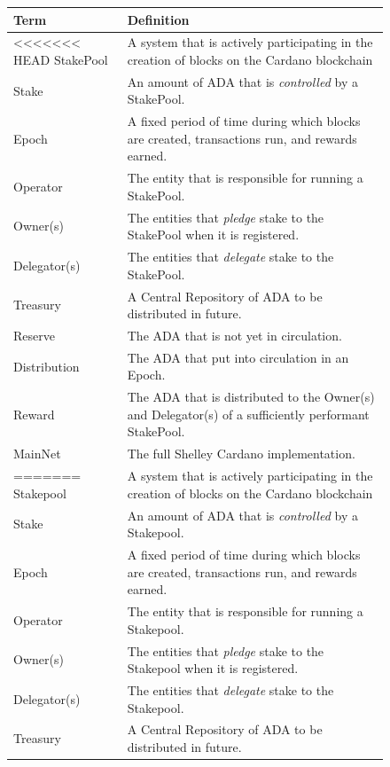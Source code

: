 \documentclass[11pt,a4paper,dvipsnames,twosided,final]{article}
\newcommand{\ada}{ADA{}}
\newcommand{\cardano}[1]{Cardano}
\begin{document}
\begin{figure}[t]
  \begin{center}
\begin{tabular}{||l|p{12cm}||}
  \hline \hline
\textbf{Term} & \textbf{Definition} \\\hline
<<<<<<< HEAD
  StakePool & A system that is actively participating in the creation of blocks on the \cardano{} blockchain  \\\hline
  Stake & An amount of \ada{} that is \emph{controlled} by a StakePool.\\\hline
  Epoch & A fixed period of time during which blocks are created, transactions run, and rewards earned.\\\hline
Operator & The entity that is responsible for running a StakePool. \\\hline
Owner(s) & The entities that \emph{pledge} stake to the StakePool when it is registered. \\\hline
  Delegator(s) & The entities that \emph{delegate} stake to the StakePool.\\\hline
  Treasury & A Central Repository of \ada{} to be distributed in future.\\\hline
  Reserve & The \ada{} that is not yet in circulation.\\\hline
  Distribution & The \ada{} that put into circulation in an Epoch.\\\hline
  Reward & The \ada{} that is distributed to the Owner(s) and Delegator(s) of a sufficiently performant StakePool.\\\hline
  MainNet & The full Shelley \cardano{} implementation.\\\hline
=======
  Stakepool & A system that is actively participating in the creation of blocks on the \cardano{} blockchain  \\\hline
  Stake & An amount of \ada{} that is \emph{controlled} by a Stakepool.\\\hline
  Epoch & A fixed period of time during which blocks are created, transactions run, and rewards earned.\\\hline
Operator & The entity that is responsible for running a Stakepool. \\\hline
Owner(s) & The entities that \emph{pledge} stake to the Stakepool when it is registered. \\\hline
  Delegator(s) & The entities that \emph{delegate} stake to the Stakepool.\\\hline
  Treasury & A Central Repository of \ada{} to be distributed in future.\\\hline

\end{tabular}
\end{center}
\end{figure}
\end{document}
